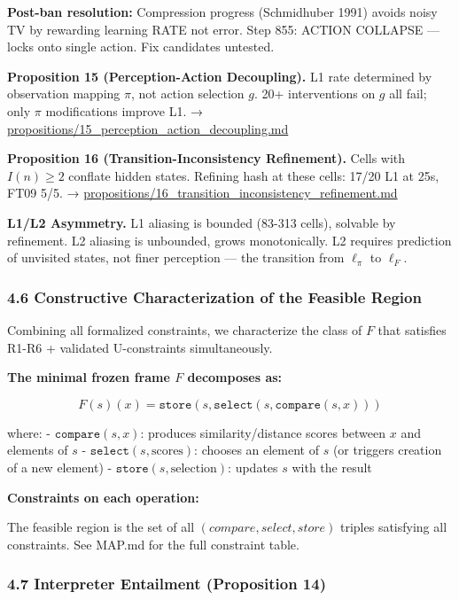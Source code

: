 \documentclass[
  11pt,
]{article}
\begin{document}
\textbf{Post-ban resolution:} Compression progress (Schmidhuber 1991)
avoids noisy TV by rewarding learning RATE not error. Step 855: ACTION
COLLAPSE --- locks onto single action. Fix candidates untested.

\textbf{Proposition 15 (Perception-Action Decoupling).} L1 rate
determined by observation mapping \(\pi\), not action selection \(g\).
20+ interventions on \(g\) all fail; only \(\pi\) modifications improve
L1. → \url{propositions/15_perception_action_decoupling.md}

\textbf{Proposition 16 (Transition-Inconsistency Refinement).} Cells
with \(I(n) \geq 2\) conflate hidden states. Refining hash at these
cells: 17/20 L1 at 25s, FT09 5/5. →
\url{propositions/16_transition_inconsistency_refinement.md}

\textbf{L1/L2 Asymmetry.} L1 aliasing is bounded (83-313 cells),
solvable by refinement. L2 aliasing is unbounded, grows monotonically.
L2 requires prediction of unvisited states, not finer perception --- the
transition from \(\ell_\pi\) to \(\ell_F\).

\subsubsection{4.6 Constructive Characterization of the Feasible
Region}\label{constructive-characterization-of-the-feasible-region}

Combining all formalized constraints, we characterize the class of \(F\)
that satisfies R1-R6 + validated U-constraints simultaneously.

\textbf{The minimal frozen frame \(F\) decomposes as:}

\[F(s)(x) = \texttt{store}(s, \texttt{select}(s, \texttt{compare}(s, x)))\]

where: - \(\texttt{compare}(s, x)\): produces similarity/distance scores
between \(x\) and elements of \(s\) -
\(\texttt{select}(s, \text{scores})\): chooses an element of \(s\) (or
triggers creation of a new element) -
\(\texttt{store}(s, \text{selection})\): updates \(s\) with the result

\textbf{Constraints on each operation:}

The feasible region is the set of all \((compare, select, store)\)
triples satisfying all constraints. See MAP.md for the full constraint
table.

\subsubsection{4.7 Interpreter Entailment (Proposition
14)}\label{interpreter-entailment-proposition-14}
\end{document}
